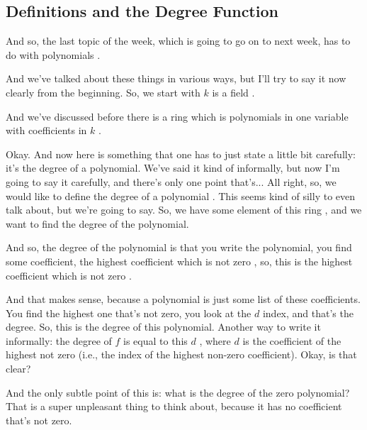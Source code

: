 \subsection{Definitions and the Degree Function}

\begin{speech}[00:22:20 - 00:23:46]
And so, the last topic of the week, which is going to go on to next week, has to do with polynomials .

And we've talked about these things in various ways, but I'll try to say it now clearly from the beginning. So, we start with $k$ is a field .

And we've discussed before there is a ring which is polynomials in one variable  with coefficients in $k$ .

Okay. And now here is something that one has to just state a little bit carefully: it's the degree of a polynomial. We've said it kind of informally, but now I'm going to say it carefully, and there's only one point that's... All right, so, we would like to define the degree of a polynomial . This seems kind of silly to even talk about, but we're going to say. So, we have some element of this ring , and we want to find the degree of the polynomial.
\end{speech}

\begin{hidden}
\end{hidden}

\begin{speech}[00:23:46 - 00:24:40]
And so, the degree of the polynomial is that you write the polynomial, you find some coefficient, the highest coefficient which is not zero , so, this is the highest coefficient  which is not zero .

And that makes sense, because a polynomial is just some list of these coefficients. You find the highest one that's not zero, you look at the $d$ index, and that's the degree. So, this is the degree of this polynomial. Another way to write it informally: the degree of $f$ is equal to this $d$ , where $d$ is the coefficient of the highest not zero (i.e., the index of the highest non-zero coefficient). Okay, is that clear?

And the only subtle point of this is: what is the degree of the zero polynomial?  That is a super unpleasant thing to think about, because it has no coefficient that's not zero.
\end{speech}

